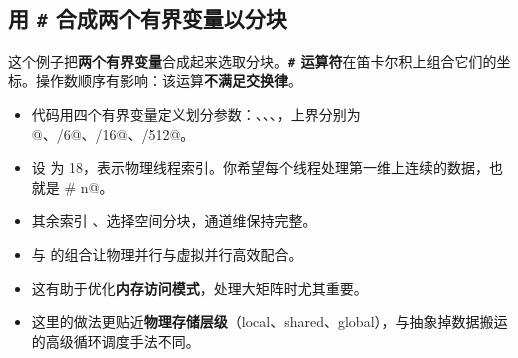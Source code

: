 \subsection*{用 \texttt{\#} 合成两个有界变量以分块}

这个例子把\textbf{两个有界变量}合成起来选取分块。\textbf{\texttt{\#} 运算符}在笛卡尔积上组合它们的坐标。操作数顺序有影响：该运算\textbf{不满足交换律}。

\begin{itemize}[leftmargin=1.6em]
\item 代码用四个有界变量定义划分参数：\co@q@、\co@n@、\co@h@、\co@w@，上界分别为 @、\co@N/6@、\co@H/16@、\co@W/512@。
\item 设 \co@N@ 为 18，\co@q@ 表示物理线程索引。你希望每个线程处理第一维上连续的数据，也就是 \co@q # n@。
\item 其余索引 \co@h@、\co@w@ 选择空间分块，通道维保持完整。
\end{itemize}

\begin{itemize}[leftmargin=1.6em]
\item \co@q@ 与 \co@n@ 的组合让物理并行与虚拟并行高效配合。
\item 这有助于优化\textbf{内存访问模式}，处理大矩阵时尤其重要。
\item 这里的做法更贴近\textbf{物理存储层级}（local、shared、global），与抽象掉数据搬运的高级循环调度手法不同。
\end{itemize}
